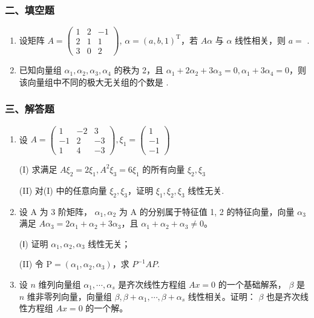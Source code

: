\documentclass[12pt, a4paper]{ctexart}
\begin{document}
\subsubsection*{二、填空题}

\begin{enumerate}[start=8]
    \item 设矩阵 $ A = \begin{pmatrix} 1 & 2 & -1 \\ 2 & 1 & 1 \\ 3 & 0 & 2 \end{pmatrix} $, $ \alpha = (a, b, 1)^{\mathrm{T}} $，若 $ A\alpha $ 与 $ \alpha $ 线性相关，则 $ a = $ \underline{\hspace{2cm}}.

    \item 已知向量组 $ \alpha_{1}, \alpha_{2}, \alpha_{3}, \alpha_{4} $ 的秩为 2，且 $ \alpha_{1} + 2\alpha_{2} + 3\alpha_{3} = 0, \alpha_{1} + 3\alpha_{4} = 0 $，则该向量组中不同的极大无关组的个数是 \underline{\hspace{2cm}}.
\end{enumerate}

\subsubsection*{三、解答题}

\begin{enumerate}[start=10]
    \item 设 $ A=\begin{pmatrix}1&-2&3\\-1&2&-3\\1&4&-3\end{pmatrix},\xi_{1}=\begin{pmatrix}1\\-1\\-1\end{pmatrix} $
    
    (I) 求满足 $ A\xi_{2}=2\xi_{1}, A^{2}\xi_{3}=6\xi_{1} $ 的所有向量 $ \xi_{2}, \xi_{3} $
    
    (II) 对(I) 中的任意向量 $ \xi_{2}, \xi_{3} $，证明 $ \xi_{1}, \xi_{2}, \xi_{3} $ 线性无关.

    \item 设 A 为 3 阶矩阵， $ \alpha_{1}, \alpha_{2} $ 为 A 的分别属于特征值 1, 2 的特征向量，向量 $ \alpha_{3} $ 满足 $ A\alpha_{3}=2\alpha_{1}+\alpha_{2}+3\alpha_{3} $，且 $ \alpha_{1}+\alpha_{2}+\alpha_{3}\neq0 $。
    
    (Ⅰ) 证明 $ \alpha_{1},\alpha_{2},\alpha_{3} $ 线性无关；
    
    (II) 令 $ \mathrm{P}=\left(\alpha_{1},\alpha_{2},\alpha_{3}\right) $，求 $ P^{-1}AP $.

    \item 设 $ n $ 维列向量组 $ \alpha_1, \cdots, \alpha_s $ 是齐次线性方程组 $ Ax = 0 $ 的一个基础解系， $ \beta $ 是 $ n $ 维非零列向量，向量组 $ \beta, \beta + \alpha_1, \cdots, \beta + \alpha_s $ 线性相关。证明： $ \beta $ 也是齐次线性方程组 $ Ax = 0 $ 的一个解。
\end{enumerate}
\end{document}
